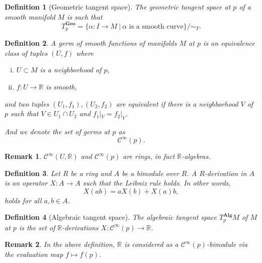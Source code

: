 \documentclass{article}
\newtheorem{definition}{Definition}[section]
\newtheorem{remark}{Remark}[section]
\numberwithin{equation}{section}
\begin{document}
\begin{definition}[Geometric tangent space]
The geometric tangent space at $p$ of a smooth manifold $M$ is such that
\begin{equation*}
T^{\mathbf{Geo}}_p=\{\alpha:I\to M\:|\: \alpha\text{ is a smooth curve}\}/\sim_T.
\end{equation*}
\end{definition}

\begin{definition}
A germ of smooth functions of manifolds $M$ at $p$ is an equivalence class of tuples $(U,f)$ where
\begin{enumerate}[i).]
\item $U\subset M$ is a neighborhood of $p$,
\item $f:U\to\mathbb{R}$ is smooth,
\end{enumerate}
and two tuples $(U_1,f_1),(U_2,f_2)$ are equivalent if there is a neighborhood $V$ of $p$ such that $V\in U_1\cap U_2$ and $f_1|_V=f_2|_V$. \\
\par And we denote the set of germs at $p$ as
\begin{equation*}
\mathcal{C}^\infty(p).
\end{equation*}
\end{definition}

\begin{remark}
$\mathcal{C}^\infty(U,\mathbb{R})$ and $\mathcal{C}^\infty(p)$ are rings, in fact $\mathbb{R}$-algebras. 
\end{remark}

\begin{definition}
Let $R$ be a ring and $A$ be a bimodule over $R$. A $R$-derivation in $A$ is an operator $X:A\to A$ such that the Leibniz rule holds. In other words, 
\begin{equation*}
X(ab) = aX(b)+X(a)b,
\end{equation*}
holds for all $a,b\in A$.
\end{definition}

\begin{definition}[Algebraic tangent space]
The algebraic tangent space $T^{\mathbf{Alg}}_pM$ of $M$ at $p$ is the set of $\mathbb{R}$-derivations $X:\mathcal{C}^\infty(p)\to\mathbb{R}$. 
\end{definition}

\begin{remark}
In the above definition, $\mathbb{R}$ is considered as a $\mathcal{C}^\infty(p)$-bimodule via the evaluation map $f\mapsto f(p)$.
\end{remark}
\end{document}
